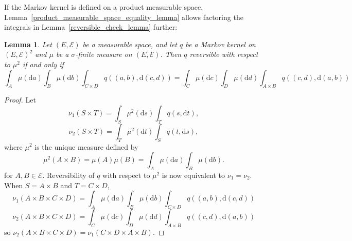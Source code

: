 \documentclass[english,twoside,openright]{HYgraduMLDS}
\newtheorem{lemma}{Lemma}[chapter]
\newcommand{\dx}{\mathrm{d}}
\begin{document}
If the Markov kernel is defined on a product measurable space,
Lemma~\ref{product_measurable_space_equality_lemma} allows factoring
the integrals in Lemma~\ref{reversible_check_lemma} further:
\begin{lemma}\label{reversible_check_product_lemma}
	Let \((E, \mathcal{E})\) be a measurable space, and let \(q\) be a Markov
  kernel on \((E, \mathcal{E})^{2}\) and \(\mu\) be a \(\sigma\)-finite measure
  on \((E, \mathcal{E})\).
  Then \(q\) reversible with respect to \(\mu^{2}\) if and only if
  \[
    \int_{A}\mu(\dx a)\int_{B}\mu(\dx b)\int_{C\times D}q((a, b), \dx(c, d))
    = \int_{C}\mu(\dx c)\int_{D}\mu(\dx d)\int_{A\times B}q((c, d), \dx(a, b))
  \]
\end{lemma}
\begin{proof}
  Let
  \[
    \nu_{1}(S\times T) = \int_{S}\mu^{2}(\dx s)\int_{T}q(s, \dx t),
  \]
  \[
    \nu_{2}(S\times T) = \int_{T}\mu^{2}(\dx t)\int_{S}q(t, \dx s),
  \]
  where \(\mu^{2}\) is the unique measure defined by
  \[
    \mu^{2}(A\times B) = \mu(A)\mu(B) = \int_{A}\mu(\dx a)\int_{B}\mu(\dx b).
  \]
  for \(A, B\in \mathcal{E}\). Reversibility of \(q\) with respect to
  \(\mu^{2}\) is now equivalent to \(\nu_{1} = \nu_{2}\).
  When \(S = A\times B\) and \(T = C\times D\),
  \[
    \nu_{1}(A\times B\times C\times D)
    = \int_{A}\mu(\dx a)\int_{B}\mu(\dx b)\int_{C\times D}q((a, b), \dx(c, d))
  \]
  \[
    \nu_{2}(A\times B\times C\times D)
    = \int_{C}\mu(\dx c)\int_{D}\mu(\dx d)\int_{A\times B}q((c, d), \dx(a, b))
  \]
  so \(\nu_{2}(A\times B\times C\times D) = \nu_{1}(C\times D\times A\times B)\).


\end{proof}
\end{document}
